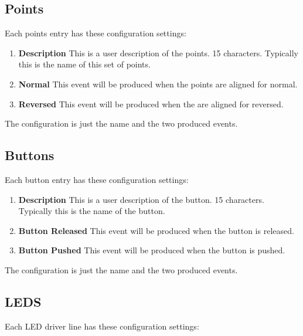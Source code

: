 \subsection{Points}

Each points entry has these configuration settings:

\begin{enumerate}
\item \textbf{Description} This is a user description of the points. 15 
characters.  Typically this is the name of this set of points.
\item \textbf{Normal} This event will be produced when the points are aligned 
for normal.
\item \textbf{Reversed} This event will be produced when the are aligned for 
reversed.
\end{enumerate}

The configuration is just the name and the two produced events.

\subsection{Buttons}

Each button entry has these configuration settings:

\begin{enumerate}
\item \textbf{Description} This is a user description of the button. 15 
characters.  Typically this is the name of the button.
\item \textbf{Button Released} This event will be produced when the button is 
released.
\item \textbf{Button Pushed} This event will be produced when the button is 
pushed.
\end{enumerate}

The configuration is just the name and the two produced events.

\subsection{LEDS}

Each LED driver line has these configuration settings:


